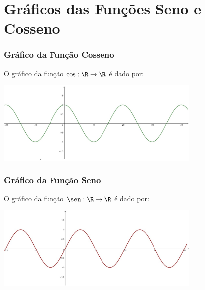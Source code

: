 \section{Gráficos das Funções Seno e Cosseno}
\begin{frame}
\frametitle{Gráfico da Função Cosseno} 

\begin{exemplo}
O gráfico da função $\cos : \R \to \R$ é dado por:
\begin{center}
\includegraphics[width=9.9cm]{figures/grafcos.jpg}
\end{center}
\end{exemplo}

\end{frame}




\begin{frame}
\frametitle{Gráfico da Função Seno} 

\begin{exemplo}
O gráfico da função $\sen: \R \to \R$ é dado por:
\begin{center}
\includegraphics[width=9.9cm]{figures/grafsen.jpg}
\end{center}
\end{exemplo}

\end{frame}

